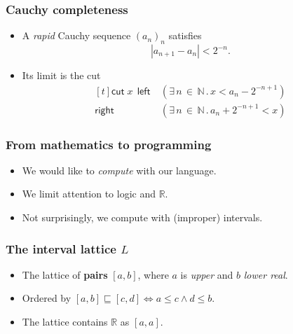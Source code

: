 \documentclass{beamer}
\newcommand{\NN}{\mathbb{N}}
\newcommand{\RR}{\mathbb{R}}
\newcommand{\xsome}[3]{\exists\, #1 \,{\in}\, #2\,.\,#3}
\newcommand{\xcut}[3]{\begin{aligned}[t]
\mathsf{cut}\; #1 \ \ \mathsf{left}\  &#2 \\
\mathsf{right}\ &#3 
\end{aligned}}
\begin{document}
\begin{frame}
  \frametitle{Cauchy completeness}

  \begin{itemize}
  \item A \emph{rapid} Cauchy sequence $(a_n)_n$ satisfies
    \begin{equation*}
      |a_{n+1} - a_n| < 2^{-n}.
    \end{equation*}
  \item Its limit is the cut
    \begin{equation*}
      \xcut{x}{(\xsome{n}{\NN}{x < a_n - 2^{-n+1}})}{(\xsome{n}{\NN}{a_n
          + 2^{-n+1} < x})}
    \end{equation*}
  \end{itemize}

\end{frame}

\begin{frame}
  \frametitle{From mathematics to programming}

  \begin{itemize}
  \item We would like to \emph{compute} with our language.
  \item We limit attention to logic and $\RR$.
  \item Not surprisingly, we compute with (improper) intervals.
  \end{itemize}
\end{frame}

\begin{frame}
  \frametitle{The interval lattice $L$}

  \begin{itemize}
  \item The lattice of \textbf{pairs} $[a,b]$, where $a$ is \emph{upper} and
    $b$ \emph{lower real}.
  \item Ordered by
    $[a,b] \sqsubseteq [c,d] \iff a \leq c \land d \leq b$.
  \item The lattice contains $\RR$ as $[a,a]$.
  \end{itemize}


  \begin{center}
    
  \end{center}
\end{frame}
\end{document}
